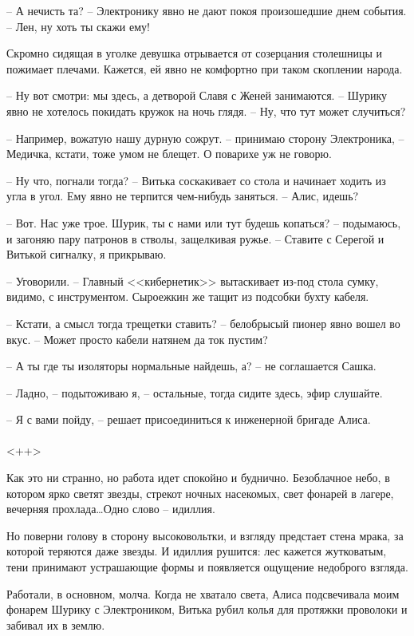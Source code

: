 \documentclass[a4paper]{book}
\begin{document}
-- А нечисть та? -- Электронику явно не дают покоя произошедшие днем события. -- Лен, ну хоть ты скажи ему!

Скромно сидящая в уголке девушка отрывается от созерцания столешницы и пожимает плечами. Кажется, ей явно не комфортно при таком скоплении народа.

-- Ну вот смотри: мы здесь, а детворой Славя с Женей занимаются. -- Шурику явно не хотелось покидать кружок на ночь глядя. -- Ну, что тут может случиться? 

-- Например, вожатую нашу дурную сожрут. -- принимаю сторону Электроника, -- Медичка, кстати, тоже умом не блещет. О поварихе уж не говорю.

-- Ну что, погнали тогда? -- Витька соскакивает со стола и начинает ходить из угла в угол. Ему явно не терпится чем-нибудь заняться. -- Алис, идешь?

-- Вот. Нас уже трое. Шурик, ты с нами или тут будешь копаться? -- подымаюсь, и загоняю пару патронов в стволы, защелкивая ружье. -- Ставите с Серегой и Витькой сигналку, я прикрываю. 

-- Уговорили. -- Главный <<кибернетик>> вытаскивает из-под стола сумку, видимо, с инструментом. Сыроежкин же тащит из подсобки бухту кабеля. 

-- Кстати, а смысл тогда трещетки ставить? -- белобрысый пионер явно вошел во вкус. -- Может просто кабели натянем да ток пустим? 

-- А ты где ты изоляторы нормальные найдешь, а? -- не соглашается Сашка.

-- Ладно, -- подытоживаю я, -- остальные, тогда сидите здесь, эфир слушайте.

-- Я с вами пойду, -- решает присоединиться к инженерной бригаде Алиса.

\paragraph{}<++>

Как это ни странно, но работа идет спокойно и буднично. Безоблачное небо, в котором ярко светят звезды, стрекот ночных насекомых, свет фонарей в лагере, вечерняя прохлада\ldots Одно слово -- идиллия. 

Но поверни голову в сторону высоковольтки, и взгляду предстает стена мрака, за которой теряются даже звезды. И идиллия рушится: лес кажется жутковатым, тени принимают устрашающие формы и появляется ощущение недоброго взгляда. 

Работали, в основном, молча. Когда не хватало света, Алиса подсвечивала моим фонарем Шурику с Электроником, Витька рубил колья для протяжки проволоки и забивал их в землю. 
\end{document}
